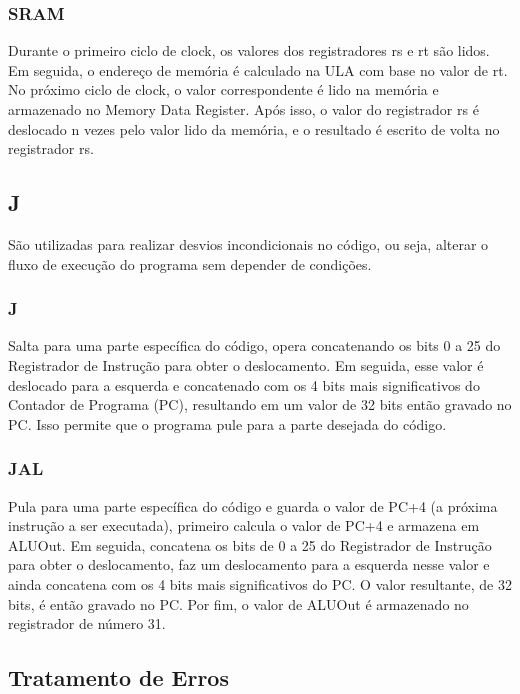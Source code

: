\subsubsection{SRAM}

Durante o primeiro ciclo de clock, os valores dos registradores rs e rt são lidos. Em seguida, o endereço de memória é calculado na ULA com base no valor de rt. No próximo ciclo de clock, o valor correspondente é lido na memória e armazenado no Memory Data Register. Após isso, o valor do registrador rs é deslocado n vezes pelo valor lido da memória, e o resultado é escrito de volta no registrador rs.

\newpage

\subsection{J}

São utilizadas para realizar desvios incondicionais no código, ou seja, alterar o fluxo de execução do programa sem depender de condições.

\subsubsection{J}

Salta para uma parte específica do código, opera concatenando os bits 0 a 25 do Registrador de Instrução para obter o deslocamento. Em seguida, esse valor é deslocado para a esquerda e concatenado com os 4 bits mais significativos do Contador de Programa (PC), resultando em um valor de 32 bits então gravado no PC. Isso permite que o programa pule para a parte desejada do código.

 \subsubsection{JAL}

Pula para uma parte específica do código e guarda o valor de PC+4 (a próxima instrução a ser executada), primeiro calcula o valor de PC+4 e armazena em ALUOut. Em seguida, concatena os bits de 0 a 25 do Registrador de Instrução para obter o deslocamento, faz um deslocamento para a esquerda nesse valor e ainda concatena com os 4 bits mais significativos do PC. O valor resultante, de 32 bits, é então gravado no PC. Por fim, o valor de ALUOut é armazenado no registrador de número 31.

 \subsection{Tratamento de Erros}
 
